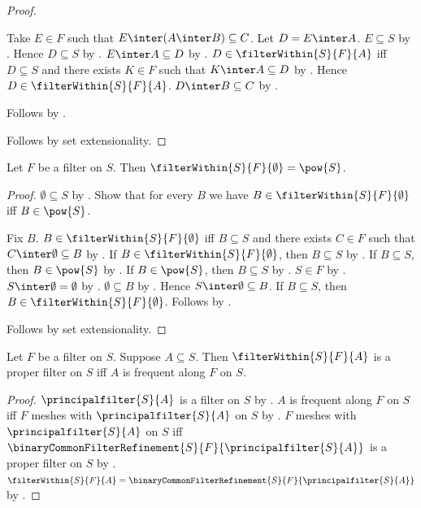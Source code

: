 \begin{proof}
\begin{subproof}
\begin{subproof}
            Take $E\in F$ such that $E\inter(A\inter B)\subseteq C$.
            Let $D=E\inter A$.
            $E\subseteq S$ by .
            Hence $D\subseteq S$ by .
            $E\inter A\subseteq D$ by .
            $D\in\filterWithin{S}{F}{A}$ iff
                $D\subseteq S$ and there exists $K\in F$ such that
                $K\inter A\subseteq D$ by .
            Hence $D\in\filterWithin{S}{F}{A}$.
            $D\inter B\subseteq C$ by .
        \end{subproof}
        Follows by \auto.
    \end{subproof}
    Follows by set extensionality.
\end{proof}

\begin{proposition}\label{filter_within_emptyset}
    Let $F$ be a filter on $S$.
    Then $\filterWithin{S}{F}{\emptyset}=\pow{S}$.
\end{proposition}
\begin{proof}
    $\emptyset\subseteq S$ by .
    Show that for every $B$ we have
        $B\in\filterWithin{S}{F}{\emptyset}$ iff $B\in\pow{S}$.
    \begin{subproof}
        Fix $B$.
        $B\in\filterWithin{S}{F}{\emptyset}$ iff
            $B\subseteq S$ and there exists $C\in F$ such that
            $C\inter\emptyset\subseteq B$ by .
        If $B\in\filterWithin{S}{F}{\emptyset}$, then $B\subseteq S$ by
            \auto.
        If $B\subseteq S$, then $B\in\pow{S}$ by .
        If $B\in\pow{S}$, then $B\subseteq S$ by .
        $S\in F$ by .
        $S\inter\emptyset=\emptyset$ by .
        $\emptyset\subseteq B$ by .
        Hence $S\inter\emptyset\subseteq B$.
        If $B\subseteq S$, then $B\in\filterWithin{S}{F}{\emptyset}$.
        Follows by \auto.
    \end{subproof}
    Follows by set extensionality.
\end{proof}

\begin{theorem}\label{filter_within_is_proper_iff_frequent}
    Let $F$ be a filter on $S$.
    Suppose $A\subseteq S$.
    Then $\filterWithin{S}{F}{A}$ is a proper filter on $S$ iff
        $A$ is frequent along $F$ on $S$.
\end{theorem}
\begin{proof}
    $\principalfilter{S}{A}$ is a filter on $S$ by
        .
    $A$ is frequent along $F$ on $S$ iff
        $F$ meshes with $\principalfilter{S}{A}$ on $S$ by
        .
    $F$ meshes with $\principalfilter{S}{A}$ on $S$ iff
        $\binaryCommonFilterRefinement{S}{F}{\principalfilter{S}{A}}$
        is a proper filter on $S$ by
        .
    $\filterWithin{S}{F}{A}
        =\binaryCommonFilterRefinement{S}{F}{\principalfilter{S}{A}}$ by
        .
\end{proof}

